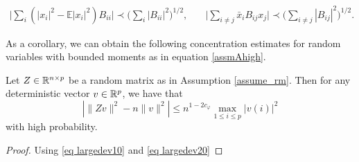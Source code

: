 \begin{lemma}
\begin{align}
 \Big\vert  \sum_{i} (|x_i|^2-\mathbb E|x_i|^2) B_{ii}  \Big\vert  \prec  \Big( \sum_i |B_{ii} |^2\Big)^{1/2}  ,\quad & \Big\vert  \sum_{i\ne j} \bar x_i B_{ij} x_j \Big\vert  \prec \Big(\sum_{i\ne j} |B_{ij}|^2\Big)^{{1}/{2}} .\label{eq largedev2}
\end{align}
\end{lemma}

As a corollary, we can obtain the following concentration estimates for random variables with bounded moments as in equation \eqref{assmAhigh}. 

\begin{corollary} \label{cor_largedeviation}
Let $Z\in \mathbb{R}^{n\times p}$ be a random matrix as in Assumption \ref{assume_rm}. Then for any deterministic vector $v\in \mathbb{R}^p$, we have that
$$\left|\|Zv\|^2- n\|v\|^2\right|\le  n^{1-2c_\varphi} \max_{1\le i\le p}|v(i)|^2$$
with high probability.
\end{corollary}
 \begin{proof}
 Using \eqref{eq largedev10} and \eqref{eq largedev20}
 \end{proof}